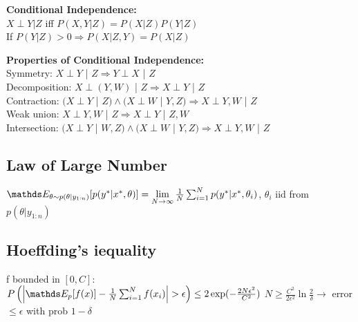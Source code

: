 \textbf{Conditional Independence:}\\
$X\perp Y | Z $ iff $P(X,Y|Z)=P(X|Z)P(Y|Z)$\\
If $P(Y|Z)>0 \Rightarrow P(X|Z,Y)=P(X|Z)$

\textbf{Properties of Conditional Independence:}\\
Symmetry: $X \perp Y$ | $Z \Rightarrow Y \perp X$ | $Z$\\
Decomposition: $X \perp (Y,W)$ | $Z \Rightarrow X \perp Y$ | $Z$\\
Contraction: $(X \perp Y$ | $Z) \wedge (X \perp W$ | $Y, Z) \Rightarrow X \perp Y, W$ | $Z$\\
Weak union: $X \perp Y,W$ | $Z \Rightarrow X \perp Y$ | $Z, W$\\
Intersection: $(X \perp Y$ | $W, Z) \wedge (X \perp W$ | $Y, Z) \Rightarrow X \perp Y, W$ | $Z$


\subsection{Law of Large Number}
$\E[\theta \sim p(\theta|y_{1:n})]{p(y^{*}|x^{*}, \theta)} =
\lim\limits_{N \to \infty} \frac{1}{N} \sum_{i=1}^{N}p(y^{*}|x^{*}, \theta_{i})$, $\theta_{i}$ iid from $p(\theta|y_{1:n})$\\

\subsection{Hoeffding's iequality}
f bounded in $\left[0,C\right]$:\\
$P\bb{\abs{\E[p]{f(x)}-\frac{1}{N}\sum_{i=1}^{N}f(x_{i})} > \epsilon} \leq 2\exp(-\frac{2N\epsilon^{2}}{C^2})$
$N \geq \frac{C^2}{2\epsilon^2}\ln{\frac{2}{\delta}} \rightarrow$ error $\leq \epsilon$ with prob $1 - \delta$



